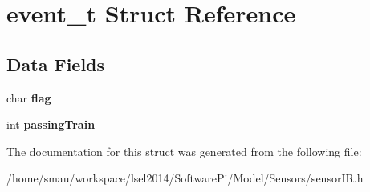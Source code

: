\hypertarget{structevent__t}{\section{event\-\_\-t Struct Reference}
\label{structevent__t}
}
\subsection*{Data Fields}
\begin{DoxyCompactItemize}
\item 
\hypertarget{structevent__t_ae49a2e1e958eab8de091b6052fb9eaab}{char {\bfseries flag}}\label{structevent__t_ae49a2e1e958eab8de091b6052fb9eaab}

\item 
\hypertarget{structevent__t_a2c269463025918531acbfe2fd087e41b}{int {\bfseries passing\-Train}}\label{structevent__t_a2c269463025918531acbfe2fd087e41b}

\end{DoxyCompactItemize}


The documentation for this struct was generated from the following file\-:\begin{DoxyCompactItemize}
\item 
/home/smau/workspace/lsel2014/\-Software\-Pi/\-Model/\-Sensors/sensor\-I\-R.\-h\end{DoxyCompactItemize}
